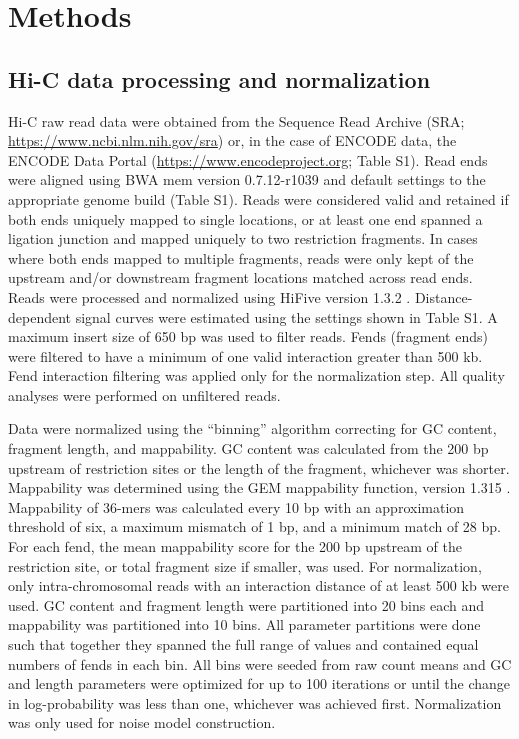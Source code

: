\section{Methods}
\subsection{Hi-C data processing and normalization}
Hi-C raw read data were obtained from the Sequence Read Archive (SRA; \url{https://www.ncbi.nlm.nih.gov/sra}) or, in the case of ENCODE data, the ENCODE Data Portal (\url{https://www.encodeproject.org}; Table S1). Read ends were aligned using BWA mem version 0.7.12-r1039 and default settings \cite{li_sequence_2009} to the appropriate genome build (Table S1). Reads were considered valid and retained if both ends uniquely mapped to single locations, or at least one end spanned a ligation junction and mapped uniquely to two restriction fragments. In cases where both ends mapped to multiple fragments, reads were only kept of the upstream and/or downstream fragment locations matched across read ends. Reads were processed and normalized using HiFive version 1.3.2 \cite{sauria_hifive:_2015}. Distance-dependent signal curves were estimated using the settings shown in Table S1. A maximum insert size of 650 bp was used to filter reads. Fends (fragment ends) were filtered to have a minimum of one valid interaction greater than 500 kb. Fend interaction filtering was applied only for the normalization step. All quality analyses were performed on unfiltered reads.

Data were normalized using the ``binning'' algorithm correcting for GC content, fragment length, and mappability. GC content was calculated from the 200 bp upstream of restriction sites or the length of the fragment, whichever was shorter. Mappability was determined using the GEM mappability function, version 1.315 \cite{koehler_uniqueome:_2011}. Mappability of 36-mers was calculated every 10 bp with an approximation threshold of six, a maximum mismatch of 1 bp, and a minimum match of 28 bp. For each fend, the mean mappability score for the 200 bp upstream of the restriction site, or total fragment size if smaller, was used. For normalization, only intra-chromosomal reads with an interaction distance of at least 500 kb were used. GC content and fragment length were partitioned into 20 bins each and mappability was partitioned into 10 bins. All parameter partitions were done such that together they spanned the full range of values and contained equal numbers of fends in each bin. All bins were seeded from raw count means and GC and length parameters were optimized for up to 100 iterations or until the change in log-probability was less than one, whichever was achieved first. Normalization was only used for noise model construction.

